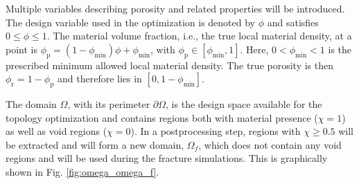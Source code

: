 \documentclass[
	pdflatex,
	sn-mathphys-num
]{sn-jnl}
\theoremstyle{thmstyleone}%
\theoremstyle{thmstyletwo}%
\theoremstyle{thmstylethree}%
\begin{document}
Multiple variables describing porosity and related properties
will be introduced. The design variable used in the
optimization is denoted by $\phi$ and satisfies
$0\le\phi\le1$. The material volume fraction, i.e., the true
local material density, at a point is
$\phi_\mathrm{p}=(1-\phi_\mathrm{min})\phi+\phi_\mathrm{min}$,
with $\phi_\mathrm{p}\in[\phi_\mathrm{min},1]$. Here,
$0 < \phi_\mathrm{min} < 1$ is the prescribed minimum allowed
local material density. The true
porosity is then
$\phi_\mathrm{r}=1-\phi_\mathrm{p}$ and therefore lies in
$[0,1-\phi_\mathrm{min}]$.

The domain $\Omega$, with its perimeter $\partial\Omega$, is the design space available for the topology optimization and contains regions both with material presence ($\chi=1$) as well as void regions ($\chi=0$). In a postprocessing step, regions with $\chi\geq0.5$ will be extracted and will form a new domain, $\Omega_f$, which does not contain any void regions and will be used during the fracture simulations. This is graphically shown in Fig. \ref{fig:omega_omega_f}.
\end{document}
